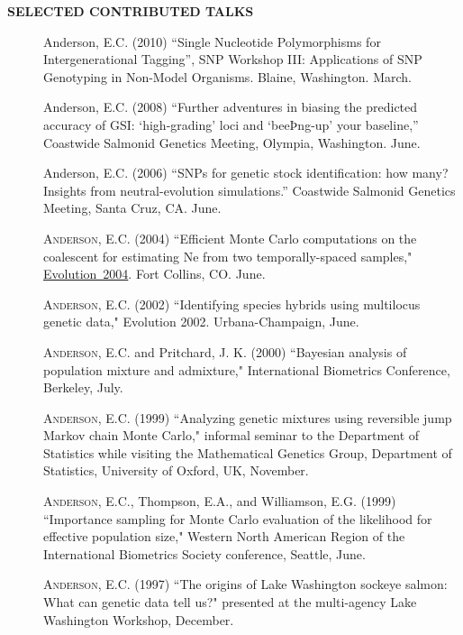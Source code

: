 \documentclass[11pt]{article}
\newlength{\postskip}
\begin{document}
\vspace*{\postskip}
{\bf SELECTED CONTRIBUTED TALKS}
\begin{description}
\item[] {\sc Anderson, E.C.} (2010) ``Single Nucleotide Polymorphisms for Intergenerational Tagging'', SNP Workshop III: Applications of SNP Genotyping in Non-Model Organisms. Blaine, Washington. March.
\item[] {\sc Anderson, E.C.} (2008) ``Further adventures in biasing the predicted accuracy of GSI: `high-grading' loci and `beeÞng-up' your baseline,'' Coastwide Salmonid Genetics Meeting, Olympia, Washington. June. 
\item[] {\sc Anderson, E.C.} (2006) ``SNPs for genetic stock identification: how many? Insights from neutral-evolution simulations.'' Coastwide Salmonid Genetics Meeting, Santa Cruz, CA. June.
\item[] \textsc{Anderson, E.C.}  (2004) ``Efficient Monte Carlo computations on the coalescent for estimating Ne from two temporally-spaced samples," \href{http://evolution04.biology.colostate.edu/mainframe.html}{Evolution~2004}. Fort Collins, CO. June.
\item[] \textsc{Anderson, E.C.}  (2002) ``Identifying species hybrids using multilocus genetic data,"
Evolution 2002. Urbana-Champaign, June.
\item[] \textsc{Anderson, E.C.} and Pritchard, J. K. (2000) ``Bayesian analysis of population mixture
and admixture," International Biometrics Conference, Berkeley, July.
\item[] \textsc{Anderson, E.C.} (1999) ``Analyzing genetic mixtures using reversible jump Markov chain
Monte Carlo," informal seminar to the Department of Statistics while visiting the Mathematical
Genetics Group, Department of Statistics, University of Oxford, UK, November.
\item[] \textsc{Anderson, E.C.}, Thompson, E.A., and Williamson, E.G. (1999) ``Importance sampling for
Monte Carlo evaluation of the likelihood for effective population size," Western North American
Region of the International Biometrics Society conference, Seattle, June.
\item[] \textsc{Anderson, E.C.} (1997) ``The origins of Lake Washington sockeye salmon: What can
genetic data tell us?" presented at the multi-agency Lake Washington Workshop, December.
\end{description}

\vspace*{\postskip}
\end{document}
